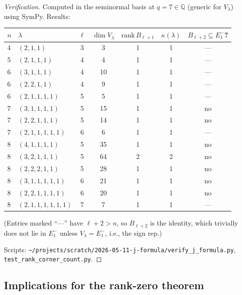 \documentclass[11pt]{article}
\theoremstyle{definition}
\begin{document}
\begin{proof}[Verification]
Computed in the seminormal basis at $q=7\in\mathbb{Q}$ (generic for
$V_\lambda$) using SymPy.  Results:

\begin{center}
\renewcommand{\arraystretch}{1.05}
\begin{tabular}{l l c c c c c}
\toprule
$n$ & $\lambda$ & $\ell$ & $\dim V_\lambda$ &
$\mathrm{rank}\,B_{\ell+1}$ & $\kappa(\lambda)$ &
$B_{\ell+2}\!\subseteq\! E_1^-$? \\
\midrule
4 & $(2,1,1)$               & 3 & 3  & 1 & 1 & --- \\
5 & $(2,1,1,1)$             & 4 & 4  & 1 & 1 & --- \\
6 & $(3,1,1,1)$             & 4 & 10 & 1 & 1 & --- \\
6 & $(2,2,1,1)$             & 4 & 9  & 1 & 1 & --- \\
6 & $(2,1,1,1,1)$           & 5 & 5  & 1 & 1 & --- \\
7 & $(3,1,1,1,1)$           & 5 & 15 & 1 & 1 & no \\
7 & $(2,2,1,1,1)$           & 5 & 14 & 1 & 1 & no \\
7 & $(2,1,1,1,1,1)$         & 6 & 6  & 1 & 1 & --- \\
8 & $(4,1,1,1,1)$           & 5 & 35 & 1 & 1 & no \\
8 & $(3,2,1,1,1)$           & 5 & 64 & 2 & 2 & no \\
8 & $(2,2,2,1,1)$           & 5 & 28 & 1 & 1 & no \\
8 & $(3,1,1,1,1,1)$         & 6 & 21 & 1 & 1 & no \\
8 & $(2,2,1,1,1,1)$         & 6 & 20 & 1 & 1 & no \\
8 & $(2,1,1,1,1,1,1)$       & 7 & 7  & 1 & 1 & --- \\
\bottomrule
\end{tabular}
\end{center}

(Entries marked ``---'' have $\ell+2>n$, so $B_{\ell+2}$ is the
identity, which trivially does not lie in $E_1^-$ unless
$V_\lambda=E_1^-$, i.e., the sign rep.)

Scripts:
\texttt{\textasciitilde/projects/scratch/2026-05-11-j-formula/verify\_j\_formula.py},
\texttt{test\_rank\_corner\_count.py}.
\end{proof}

\subsection{Implications for the rank-zero theorem}
\end{document}
